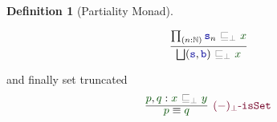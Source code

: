 \documentclass[twoside,11pt,openright]{report}
\theoremstyle{plain} %
\theoremstyle{definition}
\newtheorem{defn}{Definition}[section]
\theoremstyle{remark}
\newcommand*{\term}[1]{\textcolor{green!30!black}{#1}} %
\newcommand*{\relation}[1]{\textcolor{gray}{\ensuremath{\mathtt{#1}}}}
\newcommand*{\function}[1]{\textcolor{blue!60!black}{\ensuremath{\mathtt{#1}}}}
\newcommand*{\constructor}[1]{\textcolor{purple!60!black}{\ensuremath{\mathtt{#1}}}}
\begin{document}
\begin{defn}[Partiality Monad]
\begin{center}
\begin{minipage}{0.50\linewidth}
    \end{minipage}
    \hfill
    \begin{minipage}{0.3\linewidth}
      \begin{equation}
        \infer{\bigsqcup(\function{s},\function{b})~\relation{\sqsubseteq_{\bot}}~\term{x}}{\prod_{(n:\mathbb{N})} \function{s}_n~\relation{\sqsubseteq_{\bot}}~\term{x}}
      \end{equation}
    \end{minipage}
  \end{center}
  and finally set truncated
  \begin{equation}
    \infer[\constructor{(-)_\bot\text{-}isSet}]{\term{p} \equiv \term{q}}{\term{p} , \term{q} : \term{x}~\relation{\sqsubseteq_{\bot}}~\term{y}}
  \end{equation}
\end{defn}
\end{document}
